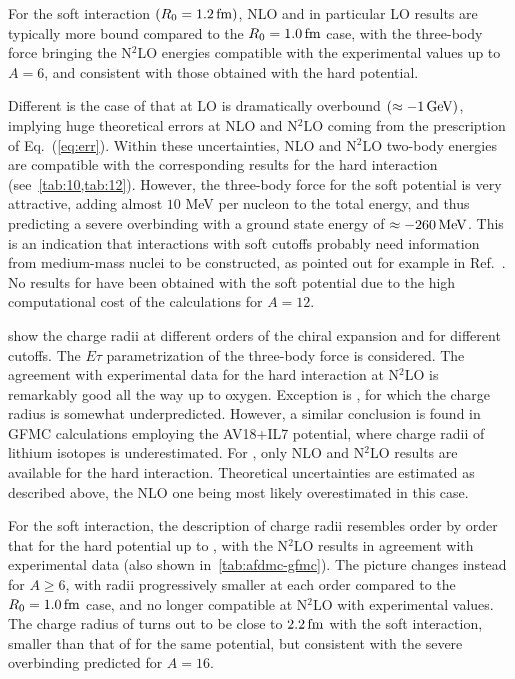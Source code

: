 \documentclass[aps,prc,twocolumn,superscriptaddress,showpacs,floatfix,nofootinbib]{revtex4-1}
\begin{document}
For the soft interaction $(R_0=1.2\,\rm fm)$, NLO and in particular LO results are 
typically more bound compared to the $R_0=1.0\,\rm fm$ case, with the three-body 
force bringing the N$^2$LO energies compatible with the experimental values up to $A=6$,
and consistent with those obtained with the hard potential. 

Different is the case of  that at LO is dramatically overbound
$(\approx -1\,\rm GeV)$, implying huge theoretical errors at NLO and N$^2$LO coming from 
the prescription of Eq.~(\ref{eq:err}). Within these uncertainties, NLO and N$^2$LO two-body energies 
are compatible with the corresponding results for the hard interaction (see~\cref{tab:10,tab:12}).
However, the three-body force for the soft potential is very attractive,
adding almost $10$ MeV per nucleon to the total energy, and thus
predicting a severe overbinding with a ground state energy of $\approx -260\,\rm MeV$.
This is an indication that interactions with soft cutoffs probably need information from 
medium-mass nuclei to be constructed, as pointed out for example in Ref.~\cite{Ekstrom:2015}.
No results for  have been obtained with the soft potential due to the high 
computational cost of the calculations for $A=12$. 

 show the charge radii at different orders of the chiral 
expansion and for different cutoffs. The $E\tau$ parametrization of the three-body force
is considered.
The agreement with experimental data for the hard interaction at N$^2$LO is remarkably
good all the way up to oxygen. Exception is , for which the charge radius
is somewhat underpredicted. However, a similar conclusion is found in GFMC calculations
employing the AV18+IL7 potential, where charge radii of lithium isotopes is underestimated. 
For , only NLO and N$^2$LO results are available for the hard interaction. 
Theoretical uncertainties are estimated as described above, the NLO one 
being most likely overestimated in this case.

For the soft interaction, the description of charge radii resembles order by order 
that for the hard potential up to , with the N$^2$LO results in agreement 
with experimental data (also shown in~\cref{tab:afdmc-gfmc}). 
The picture changes instead for $A\ge6$, with radii progressively smaller at each order
compared to the $R_0=1.0\,\rm fm$ case, and no longer compatible at N$^2$LO with experimental 
values. The charge radius of  turns out to be close to $2.2\,\rm fm$ with the 
soft interaction, smaller than that of  for the same potential, 
but consistent with the severe overbinding predicted for $A=16$.
\end{document}
